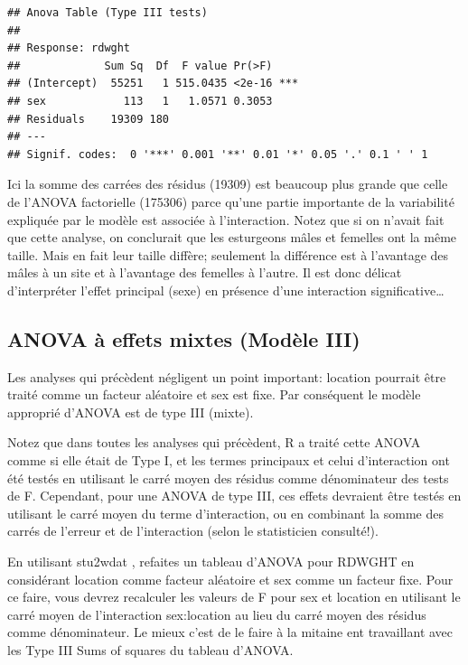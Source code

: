 \documentclass[12pt,]{book}
\begin{document}
\begin{verbatim}
## Anova Table (Type III tests)
## 
## Response: rdwght
##             Sum Sq  Df  F value Pr(>F)    
## (Intercept)  55251   1 515.0435 <2e-16 ***
## sex            113   1   1.0571 0.3053    
## Residuals    19309 180                    
## ---
## Signif. codes:  0 '***' 0.001 '**' 0.01 '*' 0.05 '.' 0.1 ' ' 1
\end{verbatim}

Ici la somme des carrées des résidus (19309) est beaucoup plus grande que celle de l'ANOVA factorielle (175306) parce qu'une partie importante de la variabilité expliquée par le modèle est associée à l'interaction. Notez que si on n'avait fait que cette analyse, on conclurait que les esturgeons mâles et femelles ont la même taille. Mais en fait leur taille diffère; seulement la différence est à l'avantage des mâles à un site et à l'avantage des femelles à l'autre. Il est donc délicat d'interpréter l'effet principal (sexe) en présence d'une interaction significative\ldots{}

\hypertarget{anova-uxe0-effets-mixtes-moduxe8le-iii}{%
\subsection{ANOVA à effets mixtes (Modèle III)}\label{anova-uxe0-effets-mixtes-moduxe8le-iii}}

Les analyses qui précèdent négligent un point important: location pourrait être traité comme un facteur aléatoire et sex est fixe. Par conséquent le modèle approprié d'ANOVA est de type III (mixte).

Notez que dans toutes les analyses qui précèdent, R a traité cette ANOVA comme si elle était de Type I, et les termes principaux et celui d'interaction ont été testés en utilisant le carré moyen des résidus comme dénominateur des tests de F. Cependant, pour une ANOVA de type III, ces effets devraient être testés en utilisant le carré moyen du terme d'interaction, ou en combinant la somme des carrés de l'erreur et de l'interaction (selon le statisticien consulté!).

En utilisant stu2wdat , refaites un tableau d'ANOVA pour RDWGHT en considérant location comme facteur aléatoire et sex comme un facteur fixe. Pour ce faire, vous devrez recalculer les valeurs de F pour sex et location en utilisant le carré moyen de l'interaction sex:location au lieu du carré moyen des résidus comme dénominateur. Le mieux c'est de le faire à la mitaine ent travaillant avec les Type III Sums of squares du tableau d'ANOVA.
\end{document}
